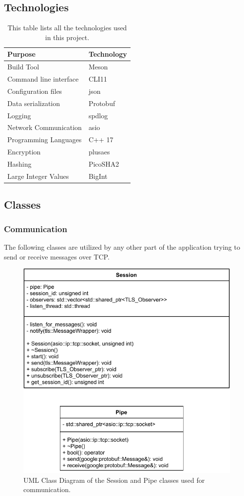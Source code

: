 \documentclass[12pt, letterpaper]{article}
\begin{document}
\subsection{Technologies}

\begin{table}[h]
	\centering
	\begin{tabular}{l|l}
		Purpose                       & Technology \\ \hline
		Build Tool				 	  & Meson	   \\
		Command line interface	      & CLI11      \\
		Configuration files           & json       \\
		Data serialization            & Protobuf   \\
		Logging                       & spdlog     \\
		Network Communication         & asio       \\
		Programming Languages		  & C++ 17 \\
		Encryption 					& plusaes \\
		Hashing 					& PicoSHA2 \\
		Large Integer Values & BigInt \\
	\end{tabular}
	\caption{This table lists all the technologies used in this project.}
\end{table}

\subsection{Classes}

\subsubsection{Communication}
The following classes are utilized by any other part of the application trying to send or receive messages over TCP.

\begin{figure}[H]
	\centering
	\includegraphics[width=.6\textwidth]{UML/CommunicationClasses}
	\caption{UML Class Diagram of the Session and Pipe classes used for communication.}
	\label{fig:CommunicationClasses}
\end{figure}
\end{document}
